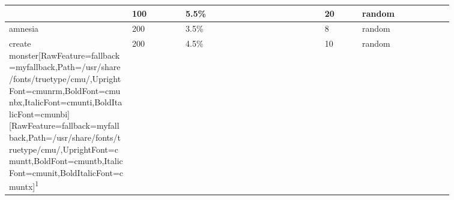 \begin{longtable}{|>{\RaggedRight}p{0.23497\linewidth}|>{\RaggedRight}p{0.10823\linewidth}|>{\RaggedRight}p{0.26606\linewidth}|>{\RaggedRight}p{0.07394\linewidth}|>{\RaggedRight}p{0.17393\linewidth}|}
3}&\hspace*{0pt}\ignorespaces{}\hspace*{0pt}100&\hspace*{0pt}\ignorespaces{}\hspace*{0pt}5.5\%&\hspace*{0pt}\ignorespaces{}\hspace*{0pt}20&\hspace*{0pt}\ignorespaces{}\hspace*{0pt}random\footnotemark[47]\\ \hline \hspace*{0pt}\ignorespaces{}\hspace*{0pt}amnesia\footnotemark[48]&\hspace*{0pt}\ignorespaces{}\hspace*{0pt}200&\hspace*{0pt}\ignorespaces{}\hspace*{0pt}3.5\%&\hspace*{0pt}\ignorespaces{}\hspace*{0pt}8&\hspace*{0pt}\ignorespaces{}\hspace*{0pt}random\footnotemark[49]\\ \hline \hspace*{0pt}\ignorespaces{}\hspace*{0pt}create monster\footnotemark[50]\allowbreak{}\setmainfont{cmunrm.ttf}[RawFeature={fallback=myfallback},Path=/usr/share/fonts/truetype/cmu/,UprightFont=cmunrm,BoldFont=cmunbx,ItalicFont=cmunti,BoldItalicFont=cmunbi]\setmonofont{cmunrm.ttf}[RawFeature={fallback=myfallback},Path=/usr/share/fonts/truetype/cmu/,UprightFont=cmuntt,BoldFont=cmuntb,ItalicFont=cmunit,BoldItalicFont=cmuntx]\textsuperscript{1}&\hspace*{0pt}\ignorespaces{}\hspace*{0pt}200&\hspace*{0pt}\ignorespaces{}\hspace*{0pt}4.5\%&\hspace*{0pt}\ignorespaces{}\hspace*{0pt}10&\hspace*{0pt}\ignorespaces{}\hspace*{0pt}random\footnotemark[51]\\ \hline 
\end{longtable}
